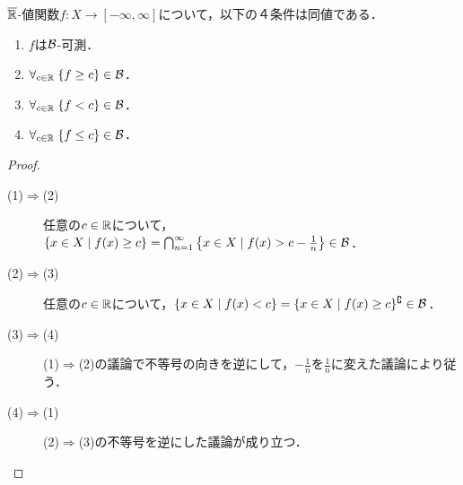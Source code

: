 \documentclass[uplatex, dvipdfmx]{jsreport}
\begin{document}
\begin{lemma}[拡張実可測関数の特徴付け]\label{lemma-characterization-of-measurable-function}
    $\overline{\mathbb{R}}$-値関数$f:X\to[-\infty,\infty]$について，以下の４条件は同値である．
    \begin{enumerate}
        \item $f$は$\mathcal{B}$-可測．
        \item $\forall_{c\in\mathbb{R}}\;\{f\ge c\}\in\mathcal{B}$．
        \item $\forall_{c\in\mathbb{R}}\;\{f< c\}\in\mathcal{B}$．
        \item $\forall_{c\in\mathbb{R}}\;\{f\le c\}\in\mathcal{B}$．
    \end{enumerate}
\end{lemma}
\begin{proof}\mbox{}
    \begin{description}
        \item[(1)$\Rightarrow$(2)] 任意の$c\in\mathbb{R}$について，$\{x\in X\mid f(x)\ge c\}=\bigcap_{n=1}^\infty\left\{x\in X\mid f(x)>c-\frac{1}{n}\right\}\in\mathcal{B}$．
        \item[(2)$\Rightarrow$(3)] 任意の$c\in\mathbb{R}$について，$\{x\in X\mid f(x)< c\}=\{x\in X\mid f(x)\ge c\}^\complement\in\mathcal{B}$．
        \item[(3)$\Rightarrow$(4)] (1)$\Rightarrow$(2)の議論で不等号の向きを逆にして，$-\frac{1}{n}$を$\frac{1}{n}$に変えた議論により従う．
        \item[(4)$\Rightarrow$(1)] (2)$\Rightarrow$(3)の不等号を逆にした議論が成り立つ．
    \end{description}
\end{proof}
\end{document}
